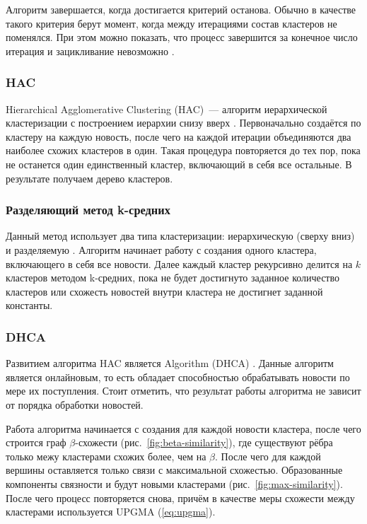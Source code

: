 Алгоритм завершается, когда достигается критерий останова. Обычно в качестве такого критерия берут момент, когда между итерациями состав кластеров не поменялся. При этом можно показать, что процесс завершится за конечное число итерация и зацикливание невозможно \cite{manning09}.

\subsubsection{HAC}
Hierarchical Agglomerative Clustering (HAC)~--- алгоритм иерархической кластеризации с построением иерархии снизу вверх \cite{manning09}. Первоначально создаётся по кластеру на каждую новость, после чего на каждой итерации объединяются два наиболее схожих кластеров в один. Такая процедура повторяется до тех пор, пока не останется один единственный кластер, включающий в себя все остальные. В результате получаем дерево кластеров.

\subsubsection{Разделяющий метод k-средних}
Данный метод использует два типа кластеризации: иерархическую (сверху вниз) и разделяемую \cite{steinbach00}. Алгоритм начинает работу с создания одного кластера, включающего в себя все новости. Далее каждый кластер рекурсивно делится на $k$ кластеров методом k-средних, пока не будет достигнуто заданное количество кластеров или схожесть новостей внутри кластера не достигнет заданной константы.

\subsubsection{DHCA}
Развитием алгоритма HAC является Algorithm (DHCA) \cite{gil05}. Данные алгоритм является онлайновым, то есть обладает способностью обрабатывать новости по мере их поступления. Стоит отметить, что результат работы алгоритма не зависит от порядка обработки новостей.

Работа алгоритма начинается с создания для каждой новости кластера, после чего строится граф $\beta$-схожести (рис.~\ref{fig:beta-similarity}), где существуют рёбра только межу кластерами схожих более, чем на $\beta$. После чего для каждой вершины оставляется только связи с максимальной схожестью. Образованные компоненты связности и будут новыми кластерами (рис.~\ref{fig:max-similarity}). После чего процесс повторяется снова, причём в качестве меры схожести между кластерами используется UPGMA (\ref{eq:upgma}).

